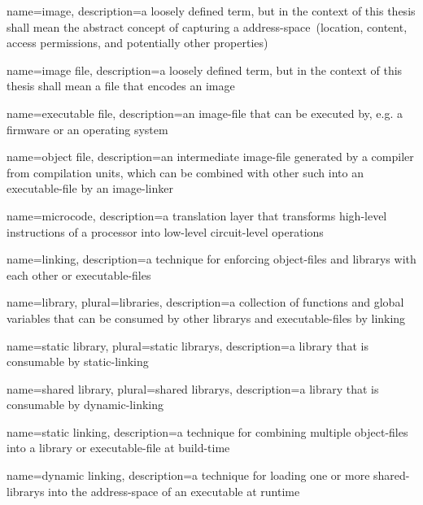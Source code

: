 {
  name={image},
  description={a loosely defined term, but in the context of this thesis shall mean the abstract concept of capturing a \gls{address-space}~(location, content, access permissions, and potentially other properties)}
}

{
  name={\gls{image} file},
  description={a loosely defined term, but in the context of this thesis shall mean a file that encodes an \gls{image}}
}

{
  name={executable file},
  description={an \gls{image-file} that can be executed by, e.g. a \gls{firmware} or an operating system}
}

{
  name={object file},
  description={an intermediate \gls{image-file} generated by a compiler from compilation units, which can be combined with other such into an \gls{executable-file} by an \gls{image-linker}}
}

{
  name={microcode},
  description={a translation layer that transforms high-level instructions of a processor into low-level circuit-level operations}
}

{
  name={linking},
  description={a technique for enforcing \glspl{object-file} and \glspl{library}} with each other or \glspl{executable-file}
}

{
  name={library},
  plural={libraries},
  description={a collection of functions and global variables that can be consumed by other \glspl{library} and \glspl{executable-file} by \gls{linking}}
}

{
  name={static \gls{library}},
  plural={static \glspl{library}},
  description={a \gls{library} that is consumable by \gls{static-linking}}
}

{
  name={shared \gls{library}},
  plural={shared \glspl{library}},
  description={a \gls{library} that is consumable by \gls{dynamic-linking}}
}

{
  name={static \gls{linking}},
  description={a technique for combining multiple \glspl{object-file} into a \gls{library} or \gls{executable-file} at build-time}
}

{
  name={dynamic \gls{linking}},
  description={a technique for loading one or more \glspl{shared-library} into the \gls{address-space} of an executable at runtime}
}

